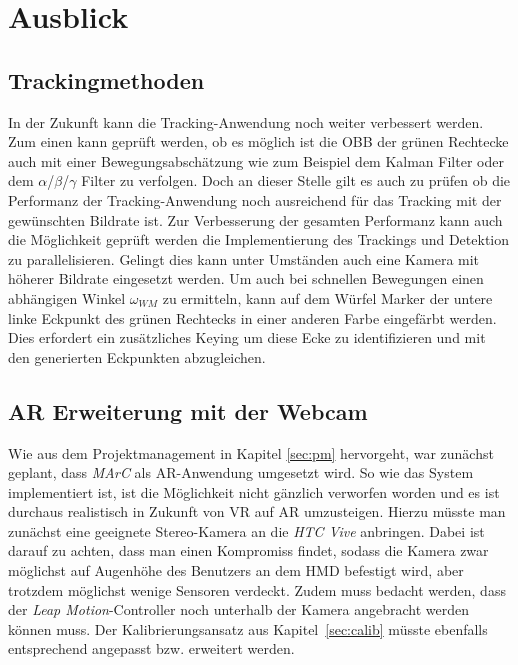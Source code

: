 \section{Ausblick}\label{sec:ausblick}
\subsection{Trackingmethoden}
In der Zukunft kann die Tracking-Anwendung noch weiter verbessert werden. Zum einen kann geprüft werden, ob es möglich ist die OBB der grünen Rechtecke auch mit einer Bewegungsabschätzung wie zum Beispiel dem Kalman Filter \cite{article:Kalman} oder dem $\alpha$/$\beta$/$\gamma$ Filter \cite{article:alphabetagamma} zu verfolgen. Doch an dieser Stelle gilt es auch zu prüfen ob die Performanz der Tracking-Anwendung noch ausreichend für das Tracking mit der gewünschten Bildrate ist. Zur Verbesserung der gesamten Performanz kann auch die Möglichkeit geprüft werden die Implementierung des Trackings und Detektion zu parallelisieren. Gelingt dies kann unter Umständen auch eine Kamera mit höherer Bildrate eingesetzt werden.
Um auch bei schnellen Bewegungen einen abhängigen Winkel $\omega_{WM}$ zu ermitteln, kann auf dem Würfel Marker der untere linke Eckpunkt des grünen Rechtecks in einer anderen Farbe eingefärbt werden. Dies erfordert ein zusätzliches Keying um diese Ecke zu identifizieren und mit den generierten Eckpunkten abzugleichen.

\subsection{AR Erweiterung mit der Webcam} \label{sec:PlanedWebcam}
Wie aus dem Projektmanagement in Kapitel \ref{sec:pm} hervorgeht, war zunächst geplant, dass \textit{MArC} als AR-Anwendung umgesetzt wird. So wie das System implementiert ist, ist die Möglichkeit nicht gänzlich verworfen worden und es ist durchaus realistisch in Zukunft von VR auf AR umzusteigen. Hierzu müsste man zunächst eine geeignete Stereo-Kamera an die \textit{HTC Vive} anbringen. Dabei ist darauf zu achten, dass man einen Kompromiss findet, sodass die Kamera zwar möglichst auf Augenhöhe des Benutzers an dem HMD befestigt wird, aber trotzdem möglichst wenige Sensoren verdeckt. Zudem muss bedacht werden, dass der \textit{Leap Motion}-Controller noch unterhalb der Kamera angebracht werden können muss. Der Kalibrierungsansatz aus Kapitel~\ref{sec:calib} müsste ebenfalls entsprechend angepasst bzw. erweitert werden. 


